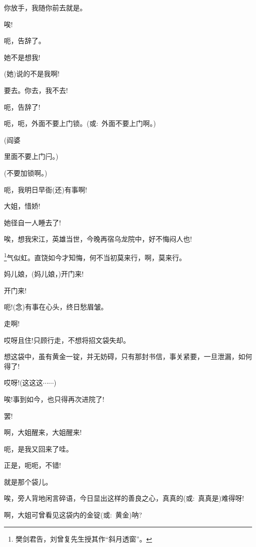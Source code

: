 {{你放手，我随你前去就是。}

{唉!}\hspace{30pt}~

{呃，告辞了。}

{她不是想我!}

{(她)说的不是我啊!}

{要去。你去，我不去!}

{呃，告辞了!}

{呃，呃，外面不要上门锁。(或:~外面不要上门啊。)}

{(阎婆\hspace{30pt}~

里面不要上门闩。)}

{(不要加锁啊。)}

{呃，我明日早衙(还)有事啊!}

{大姐，惜娇!}

{她径自一人睡去了!}

{唉，想我宋江，英雄当世，今晚再宿乌龙院中，好不悔闷人也!}


\footnote{樊剑君告，刘曾复先生授其作``斜月透窗''。}{气似虹。直饶如今才知悔，何不当初莫来行，啊，莫来行。}

{妈儿娘，(妈儿娘，)开门来!}

{开门来!}\hspace{10pt}~

{呃!({\akai 念})有事在心头，终日愁眉皱。}

{走啊!}\hspace{20pt}~

{哎呀且住!只顾行走，不想将招文袋失却。}

{想这袋中，虽有黄金一锭，并无妨碍，只有那封书信，事关紧要，一旦泄漏，如何得了!}

{哎呀!(这这这$\cdots{}\cdots{}$)}

{唉!事到如今，也只得再次进院了!}

{罢!}\hspace{30pt}~

{啊，大姐醒来，大姐醒来!}

{呃，是我又回来了哇。}

{正}是，呃呃，不错!

就是那个袋儿。

唉，旁人背地闲言碎语，今日显出这样的善良之心，真真的(或:~真真是)难得呀!

{啊，大姐可曾看见这袋内的金锭(或:~黄金)呐?}

}
